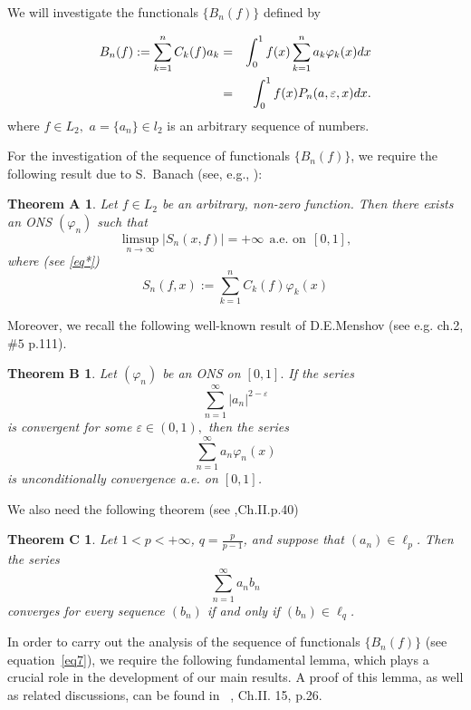 \documentclass{publmathdeb}
\newtheorem*{thm}{Theorem A } %
\newtheorem*{MenshovRademacher}{Theorem B}
\newtheorem*{theoremC}{Theorem C}
\begin{document}
	We will investigate the functionals $\{B_n(f)\}$ defined by 
	
	\begin{eqnarray}
		\label{eq7} B_n(f):=\sum_{k=1}^{n} C_k(f) a_k &= &\int_{0}^{1} f(x) \sum_{k=1}^{n} a_k \varphi_{k}(x) dx  \\
		&= & \int_{0}^{1} f(x) P_n (a, \varepsilon, x)dx. \notag 
	\end{eqnarray}
	where $f\in L_2,$ $a=\{a_n\} \in l_2$ is an arbitrary sequence of numbers.
	
	For the investigation of the sequence of functionals \( \{ B_n(f) \} \), we require the following result due to S.~Banach (see, e.g., \cite{Banach}):
	
	\begin{thm} 
		Let $f\in L_2$ be an arbitrary, non-zero function. Then there exists an ONS $({\varphi}_{n})$ such that
		$$\limsup_{n \rightarrow \infty}\left|S_n(x,f)\right|=+\infty \ \ \text{a.e. on} \ \ [0,1],$$
		where  (see \eqref{eq*})
		$$S_n(f,x):=\sum_{k=1}^n C_k(f) \varphi_k(x)$$
		
	\end{thm}
	Moreover, we recall the following well-known result of D.E.Menshov (see e.g. \cite{Alexits} ch.2, $\# 5$ p.111).
	\begin{MenshovRademacher}
		\label{theorem1.1} 
		Let $(\varphi_n)$ be an ONS on $\left[0,1\right].$ If the series
		$$\sum_{n=1}^{\infty} \left|a_n\right|^{2-\varepsilon}$$
		is convergent for some $\varepsilon \in (0, 1),$ then the series 
		$$	\sum_{n=1}^{\infty}a_n \varphi_n\left(x\right)
		$$
		is unconditionally convergence  a.e. on $\left[0,1\right]$.
	\end{MenshovRademacher}
	We also need the following theorem (see \cite{HardyLittlewoodPolya},Ch.II.p.40) 
	\begin{theoremC}Let \( 1 < p < +\infty \), \( q = \frac{p}{p - 1} \), and suppose that \( (a_n) \in \ell_p \). Then the series
		\[
		\sum_{n=1}^{\infty} a_n b_n
		\]
		converges for every sequence \( (b_n) \) if and only if \( (b_n) \in \ell_q \).
		
	\end{theoremC}
	In order to carry out the analysis of the sequence of functionals \( \{B_n(f)\} \) (see equation~\eqref{eq7}), 
	we require the following fundamental lemma, which plays a crucial role in the development of our main results. 
	A proof of this lemma, as well as related discussions, can be found in  ~\cite{HardyLittlewoodPolya}, Ch.II. 15, p.26.
	
\end{document}
